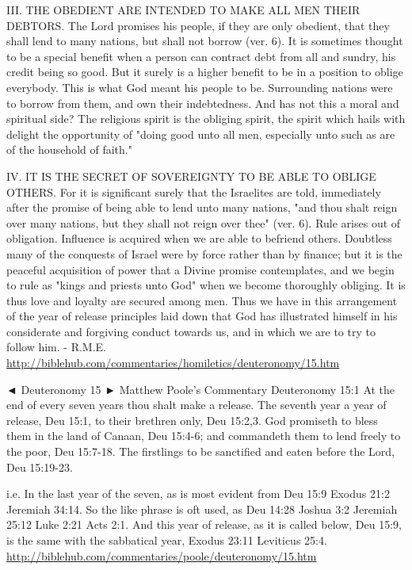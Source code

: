 \documentclass[11pt]{article}
\begin{document}
III. THE OBEDIENT ARE INTENDED TO MAKE ALL MEN THEIR DEBTORS. The Lord promises his people, if they are only obedient, that they shall lend to many nations, but shall not borrow (ver. 6). It is sometimes thought to be a special benefit when a person can contract debt from all and sundry, his credit being so good. But it surely is a higher benefit to be in a position to oblige everybody. This is what God meant his people to be. Surrounding nations were to borrow from them, and own their indebtedness. And has not this a moral and spiritual side? The religious spirit is the obliging spirit, the spirit which hails with delight the opportunity of "doing good unto all men, especially unto such as are of the household of faith."

IV. IT IS THE SECRET OF SOVEREIGNTY TO BE ABLE TO OBLIGE OTHERS. For it is significant surely that the Israelites are told, immediately after the promise of being able to lend unto many nations, "and thou shalt reign over many nations, but they shall not reign over thee" (ver. 6). Rule arises out of obligation. Influence is acquired when we are able to befriend others. Doubtless many of the conquests of Israel were by force rather than by finance; but it is the peaceful acquisition of power that a Divine promise contemplates, and we begin to rule as "kings and priests unto God" when we become thoroughly obliging. It is thus love and loyalty are secured among men. Thus we have in this arrangement of the year of release principles laid down that God has illustrated himself in his considerate and forgiving conduct towards us, and in which we are to try to follow him. - R.M.E.
\url{http://biblehub.com/commentaries/homiletics/deuteronomy/15.htm}\newline

◄ Deuteronomy 15 ►
Matthew Poole's Commentary
Deuteronomy 15:1
At the end of every seven years thou shalt make a release.
The seventh year a year of release, Deu 15:1, to their brethren only, Deu 15:2,3. God promiseth to bless them in the land of Canaan, Deu 15:4-6; and commandeth them to lend freely to the poor, Deu 15:7-18. The firstlings to be sanctified and eaten before the Lord, Deu 15:19-23. 

i.e. In the last year of the seven, as is most evident from Deu 15:9 Exodus 21:2 Jeremiah 34:14. So the like phrase is oft used, as Deu 14:28 Joshua 3:2 Jeremiah 25:12 Luke 2:21 Acts 2:1. And this year of release, as it is called below, Deu 15:9, is the same with the sabbatical year, Exodus 23:11 Leviticus 25:4. 
\url{http://biblehub.com/commentaries/poole/deuteronomy/15.htm}
\end{document}
